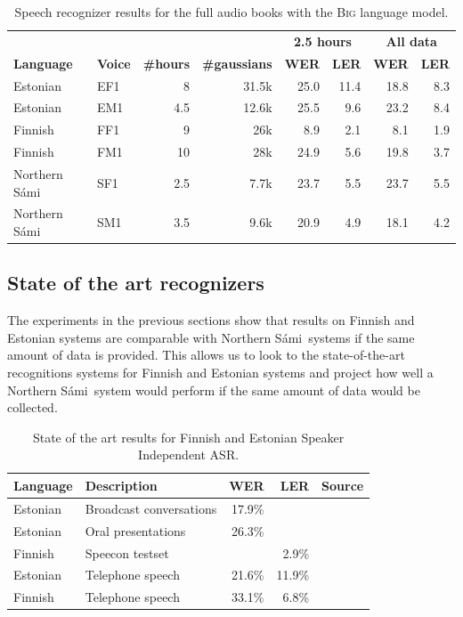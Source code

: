 \documentclass[b5paper]{article}
\newcommand{\ns}{Northern Sámi}
\newcommand{\ds}[1]{\textsc{#1}}
\begin{document}
\begin{table}
\centering
\begin{tabular}{llrr|rr|rr}
& & & & \multicolumn{2}{|c}{\textbf{2.5 hours}} & \multicolumn{2}{|c}{\textbf{All data}} \\
\textbf{Language} & \textbf{Voice} & \textbf{\#hours}  &\textbf{\#gaussians} & \textbf{WER} & \textbf{LER}& \textbf{{WER}} & \textbf{LER} \\\hline %
Estonian & EF1 & 8 &31.5k & 25.0  & 11.4 & 18.8 & 8.3  \\
Estonian & EM1& 4.5& 12.6k&25.5 & 9.6  & 23.2 & 8.4  \\
Finnish & FF1 & 9 & 26k & 8.9 & 2.1  & 8.1 &  1.9  \\
Finnish & FM1 & 10 & 28k & 24.9 & 5.6  & 19.8  & 3.7    \\
\ns & SF1 & 2.5   & 7.7k & 23.7  & 5.5  & 23.7  & 5.5  \\
\ns &SM1 & 3.5 &9.6k & 20.9 & 4.9  & 18.1  & 4.2   \\
\end{tabular}
\caption{Speech recognizer results for the full audio books with the \ds{Big} language model.\label{tbl:resultbigcomp}}
\end{table}


\subsection{State of the art recognizers}
The experiments in the previous sections show that results on Finnish and Estonian systems are comparable with \ns\ systems if the same amount of data is provided. This allows us to look to the state-of-the-art recognitions systems for Finnish and Estonian systems and project how well a \ns\ system would perform if the same amount of data would be collected.

\begin{table}
\centering
\begin{tabular}{llrrl}
\textbf{Language} & \textbf{Description} & \textbf{WER} & \textbf{LER} & \textbf{Source}\\\hline
Estonian & Broadcast conversations  & 17.9\% & &  \cite{alumae2014recent} \\
Estonian & Oral presentations  & 26.3\% & & \cite{alumae2014recent} \\
Finnish & Speecon testset  & & 2.9\%&  \cite{pylkkonen2012} \\
Estonian & Telephone speech &21.6\% & 11.9\% & \cite{hirsimaki2009importance}\\
Finnish & Telephone speech & 33.1\% & 6.8\% & \cite{hirsimaki2009importance}\\
\end{tabular}
\caption{State of the art results for Finnish and Estonian Speaker Independent ASR.}\label{tbl:stateoftheart}
\end{table}
\end{document}
